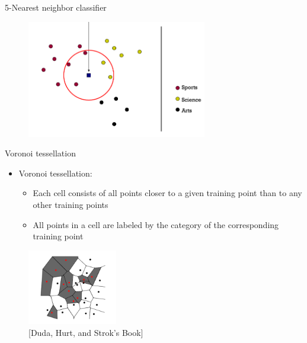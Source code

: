 \documentclass[serif, aspectratio=169]{beamer}
\begin{document}
\begin{frame}{5-Nearest neighbor classifier}
    \begin{figure}[h]
            \centering
            
            \includegraphics[width=0.7\textwidth]{pic/5NN.png}
            \end{figure}
\end{frame}
\begin{frame}{Voronoi tessellation}

    \begin{itemize}
        \item Voronoi tessellation:
         \begin{itemize}
             \item Each cell consists of all points closer to a given training point than to any other training points
             \item All points in a cell are labeled by the category of the corresponding training point
         \end{itemize}
         
         
    \end{itemize}
    \begin{figure}[h]
            \centering
            
            \includegraphics[width=0.35\textwidth]{pic/Voroni.png}
            \caption* { \scriptsize [Duda, Hurt, and Strok’s Book]}
            \end{figure}
\end{frame}
\end{document}
